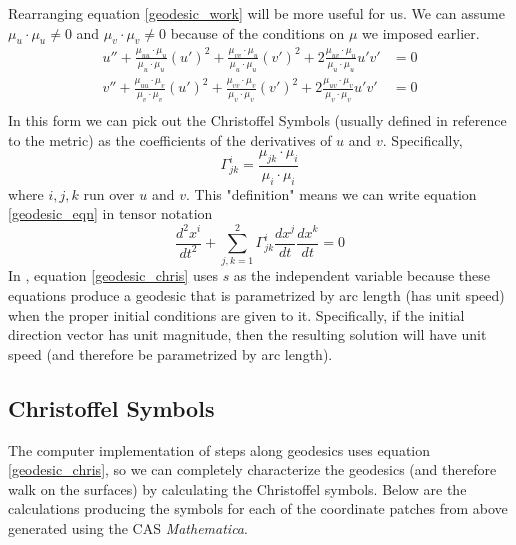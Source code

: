 \documentclass{article}
\begin{document}
		Rearranging equation \ref{geodesic_work} will be more useful for us. We can assume $\mu_u \cdot \mu_u \neq 0$  and $\mu_v \cdot \mu_v \neq 0$ because of the conditions on $\mu$ we imposed earlier.
		\begin{equation} \label{geodesic_eqn} \begin{split}
			u'' + \frac{\mu_{uu} \cdot \mu_u}{\mu_u \cdot \mu_u} (u')^2 + \frac{\mu_{vv} \cdot \mu_u}{\mu_u \cdot \mu_u} (v')^2 + 2\frac{\mu_{uv} \cdot \mu_u}{\mu_u \cdot \mu_u} u'v' & = 0 \\
			v'' + \frac{\mu_{uu} \cdot \mu_v}{\mu_v \cdot \mu_v} (u')^2 + \frac{\mu_{vv} \cdot \mu_v}{\mu_v \cdot \mu_v} (v')^2 + 2\frac{\mu_{uv} \cdot \mu_v}{\mu_v \cdot \mu_v} u'v' & = 0 \\
		\end{split} \end{equation}
		In this form we can pick out the Christoffel Symbols (usually defined in reference to the metric) as the coefficients of the derivatives of $u$ and $v$. Specifically,
		\begin{equation}
			\Gamma^i_{jk} = \frac{\mu_{jk} \cdot \mu_i}{\mu_i \cdot \mu_i}
		\end{equation}
		where $i,j,k$ run over $u$ and $v$.
		This "definition" means we can write equation \ref{geodesic_eqn} in tensor notation
		\begin{equation} \label{geodesic_chris}
			\frac{d^2 x^i}{dt^2} + \sum_{j,k = 1}^2 \Gamma^i_{jk} \frac{d x^j}{dt} \frac{dx^k}{dt} = 0
		\end{equation}
		In \cite{BanchoffLovett_DiffGeo_2010}, equation \ref{geodesic_chris} uses $s$ as the independent variable because these equations produce a geodesic that is parametrized by arc length (has unit speed) when the proper initial conditions are given to it.
		Specifically, if the initial direction vector has unit magnitude, then the resulting solution will have unit speed (and therefore be parametrized by arc length).
		
	\subsection{Christoffel Symbols}
		The computer implementation of steps along geodesics uses equation \ref{geodesic_chris}, so we can completely characterize the geodesics (and therefore walk on the surfaces) by calculating the Christoffel symbols.
		Below are the calculations producing the symbols for each of the coordinate patches from above generated using the CAS \textit{Mathematica}.
		
\end{document}
